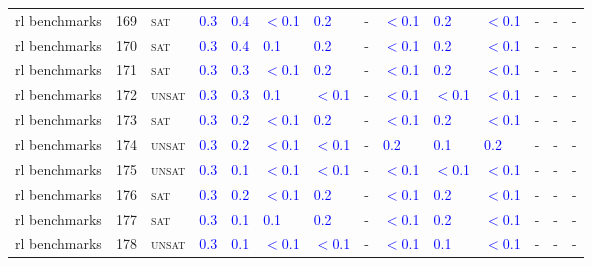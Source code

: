 \begin{center}
{\begin{longtable}{@{}llllllllllllll@{}}
rl benchmarks & 169 & \textsc{sat} & \textcolor{blue}{0.3} & \textcolor{blue}{0.4} & \textcolor{blue}{$<$0.1} & \textcolor{blue}{0.2} & - & \textcolor{blue}{$<$0.1} & \textcolor{blue}{0.2} & \textcolor{blue}{$<$0.1} & - & - & - \\
rl benchmarks & 170 & \textsc{sat} & \textcolor{blue}{0.3} & \textcolor{blue}{0.4} & \textcolor{blue}{0.1} & \textcolor{blue}{0.2} & - & \textcolor{blue}{$<$0.1} & \textcolor{blue}{0.2} & \textcolor{blue}{$<$0.1} & - & - & - \\
rl benchmarks & 171 & \textsc{sat} & \textcolor{blue}{0.3} & \textcolor{blue}{0.3} & \textcolor{blue}{$<$0.1} & \textcolor{blue}{0.2} & - & \textcolor{blue}{$<$0.1} & \textcolor{blue}{0.2} & \textcolor{blue}{$<$0.1} & - & - & - \\
rl benchmarks & 172 & \textsc{unsat} & \textcolor{blue}{0.3} & \textcolor{blue}{0.3} & \textcolor{blue}{0.1} & \textcolor{blue}{$<$0.1} & - & \textcolor{blue}{$<$0.1} & \textcolor{blue}{$<$0.1} & \textcolor{blue}{$<$0.1} & - & - & - \\
rl benchmarks & 173 & \textsc{sat} & \textcolor{blue}{0.3} & \textcolor{blue}{0.2} & \textcolor{blue}{$<$0.1} & \textcolor{blue}{0.2} & - & \textcolor{blue}{$<$0.1} & \textcolor{blue}{0.2} & \textcolor{blue}{$<$0.1} & - & - & - \\
rl benchmarks & 174 & \textsc{unsat} & \textcolor{blue}{0.3} & \textcolor{blue}{0.2} & \textcolor{blue}{$<$0.1} & \textcolor{blue}{$<$0.1} & - & \textcolor{blue}{0.2} & \textcolor{blue}{0.1} & \textcolor{blue}{0.2} & - & - & - \\
rl benchmarks & 175 & \textsc{unsat} & \textcolor{blue}{0.3} & \textcolor{blue}{0.1} & \textcolor{blue}{$<$0.1} & \textcolor{blue}{$<$0.1} & - & \textcolor{blue}{$<$0.1} & \textcolor{blue}{$<$0.1} & \textcolor{blue}{$<$0.1} & - & - & - \\
rl benchmarks & 176 & \textsc{sat} & \textcolor{blue}{0.3} & \textcolor{blue}{0.2} & \textcolor{blue}{$<$0.1} & \textcolor{blue}{0.2} & - & \textcolor{blue}{$<$0.1} & \textcolor{blue}{0.2} & \textcolor{blue}{$<$0.1} & - & - & - \\
rl benchmarks & 177 & \textsc{sat} & \textcolor{blue}{0.3} & \textcolor{blue}{0.1} & \textcolor{blue}{0.1} & \textcolor{blue}{0.2} & - & \textcolor{blue}{$<$0.1} & \textcolor{blue}{0.2} & \textcolor{blue}{$<$0.1} & - & - & - \\
rl benchmarks & 178 & \textsc{unsat} & \textcolor{blue}{0.3} & \textcolor{blue}{0.1} & \textcolor{blue}{$<$0.1} & \textcolor{blue}{$<$0.1} & - & \textcolor{blue}{$<$0.1} & \textcolor{blue}{0.1} & \textcolor{blue}{$<$0.1} & - & - & - \\

\end{longtable}}
\end{center}
